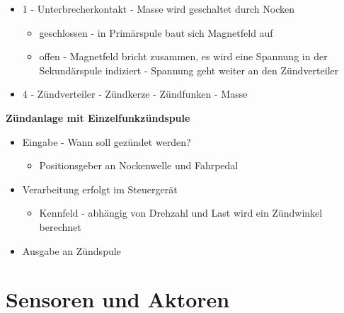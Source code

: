 \begin{itemize}
\item
  1 - Unterbrecherkontakt - Masse wird geschaltet durch Nocken

  \begin{itemize}
  \item
    geschlossen - in Primärspule baut sich Magnetfeld auf
  \item
    offen - Magnetfeld bricht zusammen, es wird eine Spannung in der
    Sekundärspule indiziert - Spannung geht weiter an den Zündverteiler
  \end{itemize}
\item
  4 - Zündverteiler - Zündkerze - Zündfunken - Masse
\end{itemize}

\textbf{Zündanlage mit Einzelfunkzündspule}

\begin{itemize}
\item
  Eingabe - Wann soll gezündet werden?

  \begin{itemize}
  \item
    Positionsgeber an Nockenwelle und Fahrpedal
  \end{itemize}
\item
  Verarbeitung erfolgt im Steuergerät

  \begin{itemize}
  \item
    Kennfeld - abhängig von Drehzahl und Last wird ein Zündwinkel
    berechnet
  \end{itemize}
\item
  Ausgabe an Zündspule
\end{itemize}

\section{Sensoren und Aktoren}\label{sensoren-und-aktoren}

